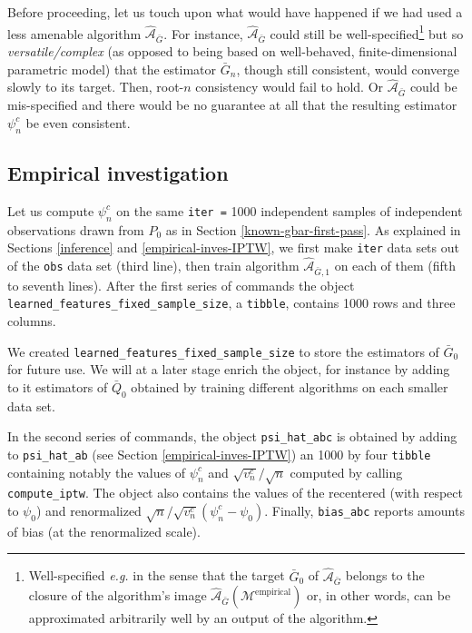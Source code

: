 \documentclass[11pt,openright,twoside]{book}
\newcommand{\Algo}{\widehat{\mathcal{A}}}
\newcommand{\calM}{\mathcal{M}}
\newcommand{\Gbar}{\bar{G}}
\newcommand{\Qbar}{\bar{Q}}
\theoremstyle{definition}
\theoremstyle{definition}
\theoremstyle{definition}
\theoremstyle{remark}
\begin{document}
Before proceeding, let us touch upon what would have happened if we had used a
less amenable algorithm \(\Algo_{\Gbar}\). For instance, \(\Algo_{\Gbar}\) could
still be well-specified\footnote{Well-specified \emph{e.g.} in the sense that the target
  \(\Gbar_{0}\) of \(\Algo_{\Gbar}\) belongs to the closure of the algorithm's image
  \(\Algo_{\Gbar}(\calM^{\text{empirical}})\) or, in other words, can be
  approximated arbitrarily well by an output of the algorithm.} but so
\emph{versatile/complex} (as opposed to being based on well-behaved,
finite-dimensional parametric model) that the estimator \(\Gbar_{n}\), though
still consistent, would converge slowly to its target. Then, root-\(n\)
consistency would fail to hold. Or \(\Algo_{\Gbar}\) could be
mis-specified and there would be no guarantee at all
that the resulting estimator \(\psi_{n}^{c}\) be even consistent.

\hypertarget{empirical-inves-IPTW-bis}{%
\subsection{Empirical investigation}\label{empirical-inves-IPTW-bis}}

Let us compute \(\psi_{n}^{c}\) on the same \texttt{iter\ =} 1000 independent
samples of independent observations drawn from \(P_{0}\) as in Section
\ref{known-gbar-first-pass}. As explained in Sections \ref{inference} and
\ref{empirical-inves-IPTW}, we first make \texttt{iter} data sets out of the \texttt{obs}
data set (third line), then train algorithm \(\Algo_{\Gbar,1}\) on each of them
(fifth to seventh lines). After the first series of commands the object
\texttt{learned\_features\_fixed\_sample\_size}, a \texttt{tibble}, contains 1000 rows and
three columns.

We created \texttt{learned\_features\_fixed\_sample\_size} to store the estimators of
\(\Gbar_{0}\) for future use. We will at a later stage enrich the object, for
instance by adding to it estimators of \(\Qbar_{0}\) obtained by training
different algorithms on each smaller data set.

In the second series of commands, the object \texttt{psi\_hat\_abc} is obtained by
adding to \texttt{psi\_hat\_ab} (see Section \ref{empirical-inves-IPTW}) an 1000
by four \texttt{tibble} containing notably the values of \(\psi_{n}^{c}\) and
\(\sqrt{v_{n}^{c}}/\sqrt{n}\) computed by calling \texttt{compute\_iptw}. The object
also contains the values of the recentered (with respect to \(\psi_{0}\)) and
renormalized \(\sqrt{n}/\sqrt{v_{n}^{c}} (\psi_{n}^{c} - \psi_{0})\). Finally,
\texttt{bias\_abc} reports amounts of bias (at the renormalized scale).
\end{document}
